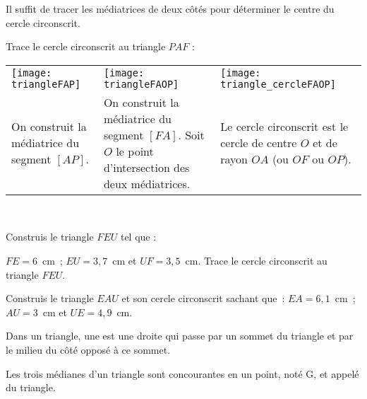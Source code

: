  \vspace{2em}
 
 \begin{methode*1}
 
\begin{remarque}
Il suffit de tracer les médiatrices de deux côtés pour déterminer le centre du cercle circonscrit.
 \end{remarque}
 
 \begin{exemple*1}
Trace le cercle circonscrit au triangle $PAF$ :
 \begin{tabularx}{\textwidth}{X|X|X}
 \texttt{[image: triangleFAP]} &  \texttt{[image: triangleFAOP]} & \texttt{[image: triangle\_cercleFAOP]} \\ 
 On construit la médiatrice du segment $[AP]$. & On construit la médiatrice du segment $[FA]$. Soit $O$ le point d'intersection des deux médiatrices. & Le cercle circonscrit est le cercle de centre $O$ et de rayon $OA$ (ou $OF$ ou $OP$). \\
\end{tabularx} \\

\end{exemple*1}

\exercice
Construis le triangle $FEU$ tel que :

$FE = 6$ cm ; $EU = 3,7$ cm et $UF = 3,5$ cm. Trace le cercle circonscrit au triangle $FEU$.
\vspace{4cm}

\exercice
Construis le triangle $EAU$ et son cercle circonscrit sachant que : $EA = 6,1$ cm ; $AU = 3$ cm et $UE = 4,9$ cm.

\vspace{2cm}

\end{methode*1}





\newpage

\begin{definition}
Dans un triangle, une  est une droite qui passe par un sommet du triangle et par le milieu du côté opposé à ce sommet.

Les trois médianes d'un triangle sont concourantes en un point, noté G, et appelé  du triangle.
\end{definition}

